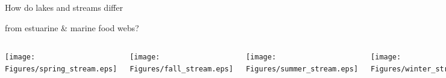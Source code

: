 \documentclass{beamer}
\begin{document}

      

        





          



  \begin{frame}{How do lakes and streams differ}
    \begin{block}{from estuarine \& marine food webs?}

      \begin{columns}
        \column{.5in}
        \column{1.9in}

        \hfill \texttt{[image: Figures/spring\_stream.eps]}

        \vspace{.2in}

        \hfill \texttt{[image: Figures/fall\_stream.eps]}

        \column{.2in}

        \column{1.9in}

        \texttt{[image: Figures/summer\_stream.eps]}

        \vspace{.2in}

        \texttt{[image: Figures/winter\_stream.eps]}

        \column{.5in}

      \end{columns}
    \end{block}

    \vfill

  \end{frame}
\end{document}
